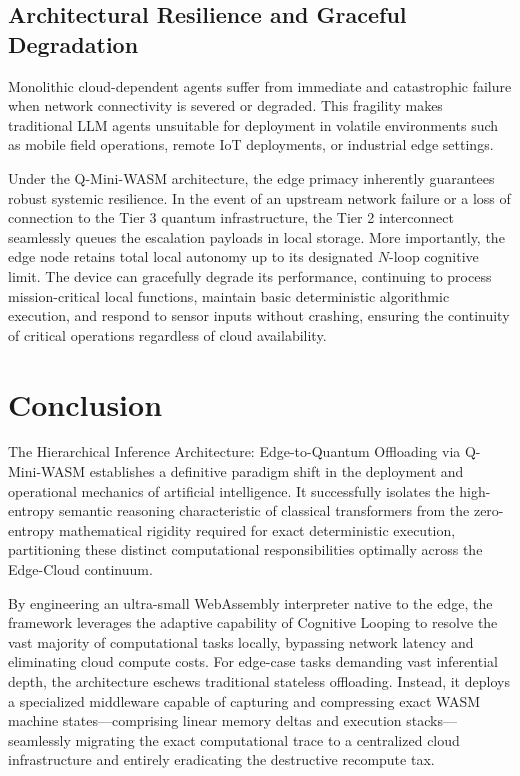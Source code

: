 \documentclass[11pt,a4paper]{article}
\begin{document}
\subsection{Architectural Resilience and Graceful Degradation}

Monolithic cloud-dependent agents suffer from immediate and catastrophic failure when network connectivity is severed or degraded. This fragility makes traditional LLM agents unsuitable for deployment in volatile environments such as mobile field operations, remote IoT deployments, or industrial edge settings.

Under the Q-Mini-WASM architecture, the edge primacy inherently guarantees robust systemic resilience. In the event of an upstream network failure or a loss of connection to the Tier 3 quantum infrastructure, the Tier 2 interconnect seamlessly queues the escalation payloads in local storage. More importantly, the edge node retains total local autonomy up to its designated $N$-loop cognitive limit. The device can gracefully degrade its performance, continuing to process mission-critical local functions, maintain basic deterministic algorithmic execution, and respond to sensor inputs without crashing, ensuring the continuity of critical operations regardless of cloud availability.

\section{Conclusion}

The Hierarchical Inference Architecture: Edge-to-Quantum Offloading via Q-Mini-WASM establishes a definitive paradigm shift in the deployment and operational mechanics of artificial intelligence. It successfully isolates the high-entropy semantic reasoning characteristic of classical transformers from the zero-entropy mathematical rigidity required for exact deterministic execution, partitioning these distinct computational responsibilities optimally across the Edge-Cloud continuum.

By engineering an ultra-small WebAssembly interpreter native to the edge, the framework leverages the adaptive capability of Cognitive Looping to resolve the vast majority of computational tasks locally, bypassing network latency and eliminating cloud compute costs. For edge-case tasks demanding vast inferential depth, the architecture eschews traditional stateless offloading. Instead, it deploys a specialized middleware capable of capturing and compressing exact WASM machine states---comprising linear memory deltas and execution stacks---seamlessly migrating the exact computational trace to a centralized cloud infrastructure and entirely eradicating the destructive recompute tax.
\end{document}
